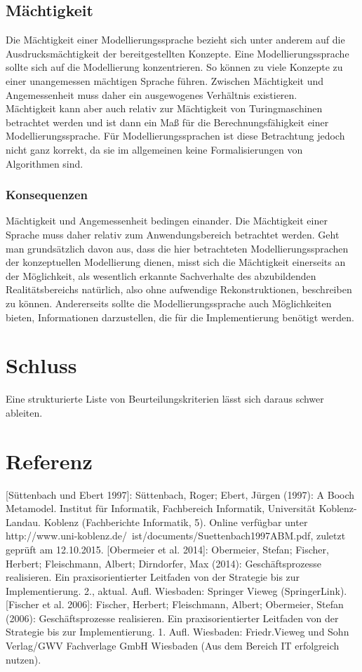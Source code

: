 \subsection{Mächtigkeit}
Die Mächtigkeit einer Modellierungssprache bezieht sich unter anderem auf die Ausdrucksmächtigkeit
der bereitgestellten Konzepte. Eine Modellierungssprache sollte sich auf die Modellierung konzentrieren.
So können zu viele Konzepte zu einer unangemessen mächtigen Sprache führen. Zwischen Mächtigkeit
und Angemessenheit muss daher ein ausgewogenes Verhältnis existieren.\\
Mächtigkeit kann aber auch relativ zur Mächtigkeit von Turingmaschinen betrachtet werden und ist
dann ein Maß für die Berechnungsfähigkeit einer Modellierungssprache. Für Modellierungssprachen
ist diese Betrachtung jedoch nicht ganz korrekt, da sie im allgemeinen keine Formalisierungen von
Algorithmen sind.
\subsubsection{Konsequenzen}
Mächtigkeit und Angemessenheit bedingen einander. Die Mächtigkeit einer Sprache muss daher relativ
zum Anwendungsbereich betrachtet werden. Geht man grundsätzlich davon aus, dass die hier betrachteten
Modellierungssprachen der konzeptuellen Modellierung dienen, misst sich die Mächtigkeit einerseits
an der Möglichkeit, als wesentlich erkannte Sachverhalte des abzubildenden Realitätsbereichs
natürlich, also ohne aufwendige Rekonstruktionen, beschreiben zu können. Andererseits sollte die
Modellierungssprache auch Möglichkeiten bieten, Informationen darzustellen, die für die Implementierung
benötigt werden.


\section{Schluss}
Eine strukturierte Liste von Beurteilungskriterien lässt sich daraus schwer ableiten.

\section{Referenz}
[Süttenbach und Ebert 1997]: Süttenbach, Roger; Ebert, Jürgen (1997): A Booch Metamodel. Institut für Informatik, Fachbereich Informatik, Universität Koblenz-Landau. Koblenz (Fachberichte Informatik, 5). Online verfügbar unter http://www.uni-koblenz.de/~ist/documents/Suettenbach1997ABM.pdf, zuletzt geprüft am 12.10.2015.
[Obermeier et al. 2014]: Obermeier, Stefan; Fischer, Herbert; Fleischmann, Albert; Dirndorfer, Max (2014): Geschäftsprozesse realisieren. Ein praxisorientierter Leitfaden von der Strategie bis zur Implementierung. 2., aktual. Aufl. Wiesbaden: Springer Vieweg (SpringerLink).
[Fischer et al. 2006]: Fischer, Herbert; Fleischmann, Albert; Obermeier, Stefan (2006): Geschäftsprozesse realisieren. Ein praxisorientierter Leitfaden von der Strategie bis zur Implementierung. 1. Aufl. Wiesbaden: Friedr.Vieweg und Sohn Verlag/GWV Fachverlage GmbH Wiesbaden (Aus dem Bereich IT erfolgreich nutzen).


